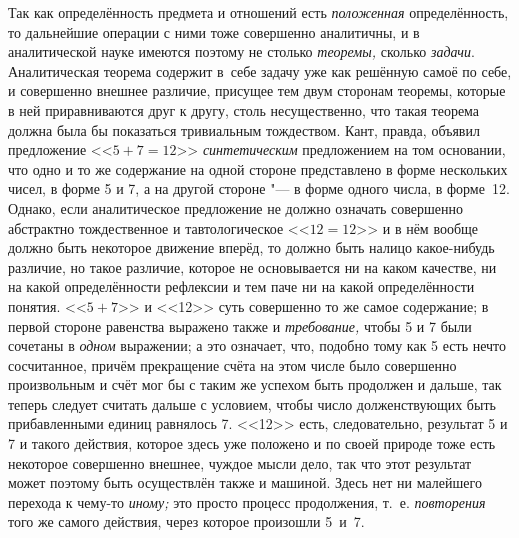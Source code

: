 Так как определённость предмета и отношений есть {\em положенная}
определённость, то дальнейшие операции с ними тоже совершенно
аналитичны, и в аналитической науке имеются поэтому не столько
{\em теоремы,} сколько {\em задачи}.
Аналитическая теорема содержит в~себе задачу уже как решённую
самоё по себе, и совершенно внешнее различие, присущее тем двум сторонам
теоремы, которые в ней приравниваются друг к другу, столь несущественно,
что такая теорема должна была бы показаться тривиальным тождеством. Кант,
правда, объявил предложение <<$5+7=12$>> {\em синтетическим}
предложением на том основании, что одно и то же содержание на
одной стороне представлено в форме нескольких чисел, в форме 5 и 7, а на
другой стороне "--- в форме одного числа, в форме~12.
Однако, если аналитическое предложение не
должно означать совершенно абстрактно тождественное и тавтологическое
<<$12=12$>> и в нём вообще должно быть некоторое движение вперёд, то должно
быть налицо какое-нибудь различие, но такое различие, которое не
основывается ни на каком качестве, ни на какой определённости рефлексии и
тем паче ни на какой определённости понятия. <<$5+7$>> и <<12>> суть совершенно
то же самое содержание; в первой стороне равенства выражено также и
{\em требование,} чтобы 5 и 7 были сочетаны в {\em одном}
выражении; а это означает, что, подобно тому как 5 есть нечто
сосчитанное, причём прекращение счёта на этом числе было совершенно
произвольным и счёт мог бы с таким же успехом быть продолжен и дальше, так
теперь следует считать дальше с условием, чтобы число долженствующих быть
прибавленными единиц равнялось 7. <<12>> есть, следовательно, результат 5 и 7
и такого действия, которое здесь уже положено и по своей природе тоже есть
некоторое совершенно внешнее, чуждое мысли дело, так что этот результат
может поэтому быть осуществлён также и машиной. Здесь нет ни малейшего
перехода к чему-то {\em иному;} это просто процесс продолжения, т.~е.
{\em повторения} того же самого действия, через которое произошли 5~и~7.

